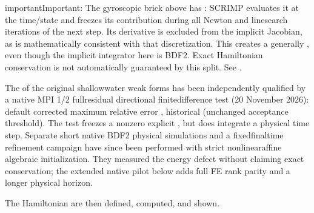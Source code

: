 \documentclass[letterpaper,10pt,english]{sphinxmanual}
\begin{document}
\begin{sphinxadmonition}{important}{Important:}
\sphinxAtStartPar
The gyroscopic brick  above has
: SCRIMP evaluates it at the  time/state and freezes its contribution during
all Newton and line\sphinxhyphen{}search iterations of the next step.
Its derivative is excluded from the implicit Jacobian,
as is mathematically consistent with that  discretization. This creates a generally
, even though the implicit
integrator here is BDF2. Exact Hamiltonian conservation
is not automatically guaranteed by this split.
See {\hyperref[\detokenize{explicit_bricks::doc}]{}}.

\sphinxAtStartPar
The  of the original
shallow\sphinxhyphen{}water weak forms has been independently
qualified by a native MPI 1/2 full\sphinxhyphen{}residual directional
finite\sphinxhyphen{}difference test (20 November 2026):
default corrected maximum relative error
, historical 
 (unchanged 
acceptance threshold). The test freezes a nonzero
explicit , but does  integrate a
physical time step. Separate short native BDF2 physical
simulations and a fixed\sphinxhyphen{}final\sphinxhyphen{}time refinement campaign have
since been performed with strict nonlinear\sphinxhyphen{}affine algebraic
initialization. They measured the energy defect without
claiming exact conservation; the extended native pilot
below adds full FE rank parity and a longer physical horizon.
\end{sphinxadmonition}

\sphinxAtStartPar
The Hamiltonian are then defined, computed, and shown.
\end{document}
